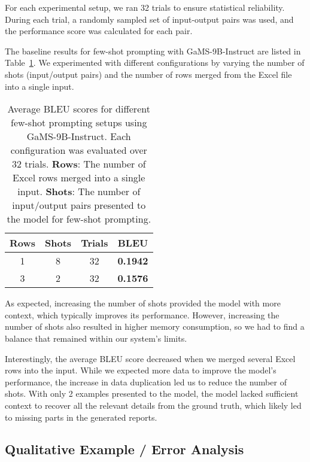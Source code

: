 \documentclass[fleqn,moreauthors,10pt]{ds_report}
\begin{document}
For each experimental setup, we ran 32 trials to ensure statistical reliability. During each trial, a randomly sampled
set of input-output pairs was used, and the performance score was calculated for each pair.


The baseline results for few-shot prompting with GaMS-9B-Instruct \cite{huggingface2025gams9b} are listed in Table~\ref{tab:bleu-results}. We experimented with different configurations by varying the number of shots (input/output pairs) and the number of rows merged from the Excel file into a single input.
\begin{table}[h!]
    \centering
    \caption{Average BLEU scores for different few-shot prompting setups using GaMS-9B-Instruct. Each configuration was evaluated over 32 trials. \textbf{Rows}: The number of Excel rows merged into a single input. \textbf{Shots}: The number of input/output pairs presented to the model for few-shot prompting.}
    \label{tab:bleu-results}
    \small
    \begin{tabular}{@{}cccc@{}}
    \toprule
    \textbf{Rows} & \textbf{Shots} & \textbf{Trials} & \textbf{BLEU} \\
    \midrule
    1 & 8 & 32 & \textbf{0.1942} \\
    3 & 2 & 32 & \textbf{0.1576} \\
    \bottomrule
    \end{tabular}
\end{table}

As expected, increasing the number of shots provided the model with more context, which typically improves its performance. However, increasing the number of shots also resulted in higher memory consumption, so we had to find a balance that remained within our system's limits.

Interestingly, the average BLEU score decreased when we merged several Excel rows into the input. While we expected more data to improve the model's performance, the increase in data duplication led us to reduce the number of shots. With only 2 examples presented to the model, the model lacked sufficient context to recover all the relevant details from the ground truth, which likely led to missing parts in the generated reports.

\subsection{Qualitative Example / Error Analysis}
\label{subsec:qualitative}
\end{document}
